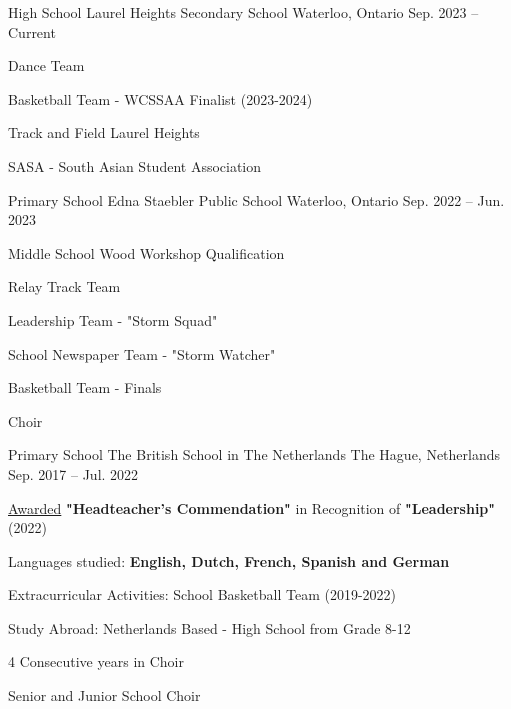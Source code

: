 


\begin{cventries}

  \cventry
    {High School} %
    {Laurel Heights Secondary School} %
    {Waterloo, Ontario} %
    {Sep. 2023 -- Current} %
    {
      \begin{cvitems}
      \item{Dance Team}
      \item{Basketball Team - WCSSAA Finalist (2023-2024)}
      \item{Track and Field Laurel Heights}
      \item{SASA - South Asian Student Association}
      \end{cvitems}
    }

  \cventry
    {Primary School} %
    {Edna Staebler Public School} %
    {Waterloo, Ontario} %
    {Sep. 2022 -- Jun. 2023} %
    {
      \begin{cvitems}
      \item{Middle School Wood Workshop Qualification}
      \item{Relay Track Team}
      \item{Leadership Team - "Storm Squad"}
      \item{School Newspaper Team - "Storm Watcher"}
      \item{Basketball Team - Finals}
      \item{Choir}
      \end{cvitems}
    }
  \cventry
    {Primary School} %
    {The British School in The Netherlands} %
    {The Hague, Netherlands} %
    {Sep. 2017 -- Jul. 2022} %
    {
      \begin{cvitems}
      \item {\underline{Awarded} \textbf{"Headteacher's Commendation"} in Recognition of \textbf{"Leadership"} (2022)}
      \item{Languages studied: \textbf{English, Dutch, French, Spanish and German}}
      \item{Extracurricular Activities: School Basketball Team (2019-2022)}
      \item{Study Abroad: Netherlands Based - High School from Grade 8-12}
      \item{4 Consecutive years in Choir}
      \item{Senior and Junior School Choir}
      \end{cvitems}
    }


\end{cventries}


